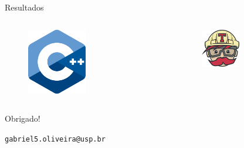 \documentclass{beamer}
\begin{document}
\begin{frame}{Resultados}
\begin{columns}
        \center
        \begin{figure}
            \includegraphics[width=0.5\textwidth]{cpp.png}
        \end{figure}
        \begin{figure}
            \includegraphics[width=0.5\textwidth]{travis.png}
        \end{figure}
        
    \end{columns}

\end{frame}

\begin{frame}
    
    \centering
    \huge Obrigado!

    \vspace{10px}

    \small \texttt{gabriel5.oliveira@usp.br}

\end{frame}
\end{document}
